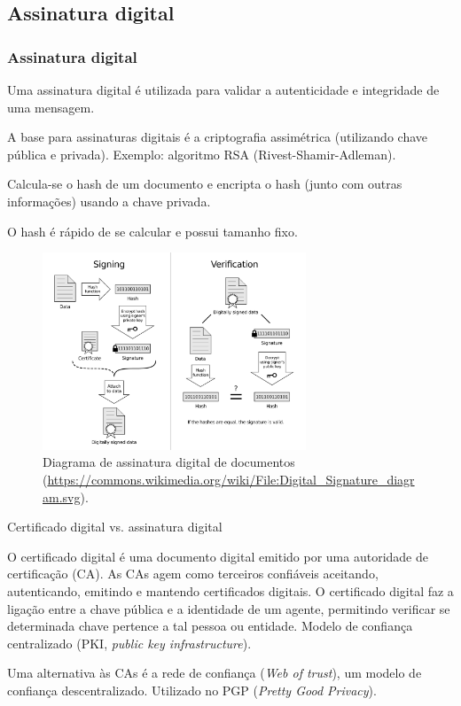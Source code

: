 \subsection{Assinatura digital}
\begin{frame}[allowframebreaks]
\frametitle{Assinatura digital}
Uma assinatura digital é utilizada para validar a autenticidade e integridade de uma mensagem.

\vspace{3ex}
A base para assinaturas digitais é a criptografia assimétrica (utilizando chave pública e privada).
Exemplo: algoritmo RSA (Rivest-Shamir-Adleman).

\vspace{3ex}
Calcula-se o hash de um documento e encripta o hash (junto com outras informações) usando a chave privada. 

\vspace{3ex} 
O hash é rápido de se calcular e possui tamanho fixo.

\begin{figure}[h]
\centering
\includegraphics[width=0.7\textwidth,height=0.7\textheight,keepaspectratio]{figures/digitalsignaturediagram.pdf}
\caption{Diagrama de assinatura digital de documentos (\url{https://commons.wikimedia.org/wiki/File:Digital_Signature_diagram.svg}).}
\label{fig-digi-sign}
\end{figure}

Certificado digital vs. assinatura digital

\vspace{2ex}
O certificado digital é uma documento digital emitido por uma autoridade de certificação (CA). 
As CAs agem como terceiros confiáveis aceitando, autenticando, emitindo e mantendo certificados digitais. 
O certificado digital faz a ligação entre a chave pública e a identidade de um agente, permitindo
verificar se determinada chave pertence a tal pessoa ou entidade.
Modelo de confiança centralizado (PKI, \textit{public key infrastructure}).

\vspace{2ex}
Uma alternativa às CAs é a rede de confiança (\textit{Web of trust}), um modelo de confiança descentralizado.
Utilizado no PGP (\textit{Pretty Good Privacy}).

\end{frame}



